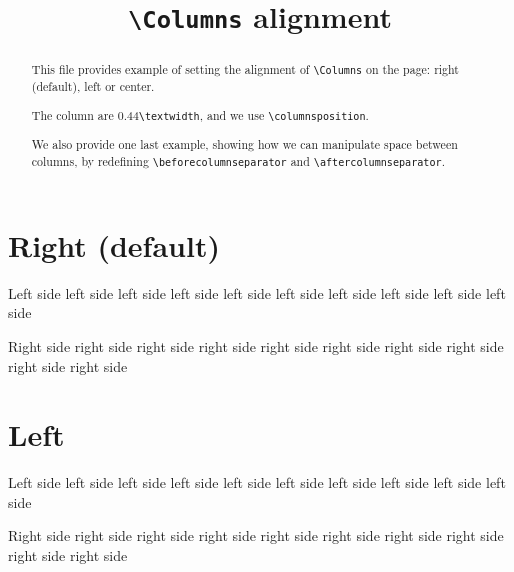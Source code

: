 \documentclass{article}
\begin{document}
\title{\texttt{\textbackslash Columns} alignment}
\date{}
\maketitle
\begin{abstract}
This file provides example of setting the alignment of \texttt{\textbackslash{}Columns} on the page: right (default), left or center.

The column are 0.44\texttt{\textbackslash{}textwidth}, and we use \texttt{\textbackslash{}columnsposition}.

We also provide one last example, showing how we can manipulate space between columns, by redefining \texttt{\textbackslash{}beforecolumnseparator} and \texttt{\textbackslash{}aftercolumnseparator}.
\end{abstract}


\section{Right (default)}

\begin{pairs}

\begin{Leftside}
\beginnumbering
\pstart
Left side left side left side left side left side left side left side left side left side left side
\pend
\endnumbering
\end{Leftside}

\begin{Rightside}
\beginnumbering
\pstart
Right side right side right side right side right side right side right side right side right side right side
\pend
\endnumbering
\end{Rightside}
\end{pairs}
\Columns

\section{Left}

\begin{pairs}

\begin{Leftside}
\beginnumbering
\pstart
Left side left side left side left side left side left side left side left side left side left side
\pend
\endnumbering
\end{Leftside}

\begin{Rightside}
\beginnumbering
\pstart
Right side right side right side right side right side right side right side right side right side right side
\pend
\endnumbering
\end{Rightside}
\end{pairs}
\Columns
\end{document}
